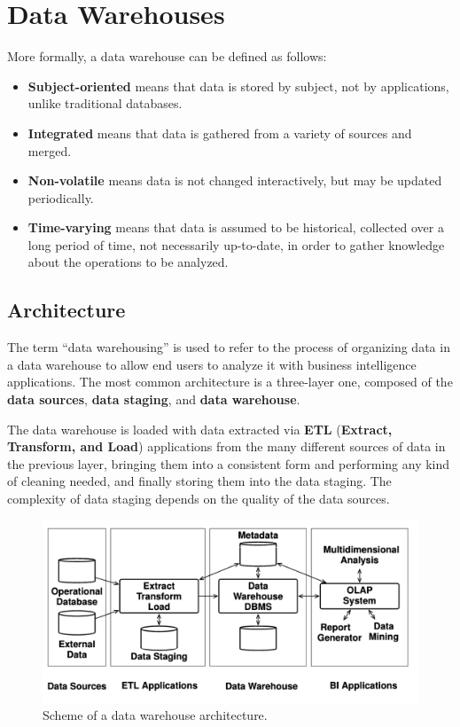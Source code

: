 \section{Data Warehouses}
More formally, a data warehouse can be defined as follows:
\begin{itemize}
    \item \textbf{Subject-oriented} means that data is stored by subject, not by applications, unlike traditional databases.
    
    \item \textbf{Integrated} means that data is gathered from a variety of sources and merged.
    
    \item \textbf{Non-volatile} means data is not changed interactively, but may be updated periodically.

    \item \textbf{Time-varying} means that data is assumed to be historical, collected over a long period of time, not necessarily up-to-date, in order to gather knowledge about the operations to be analyzed.
\end{itemize}

\subsection{Architecture}
The term ``data warehousing'' is used to refer to the process of organizing data in a data warehouse to allow end users to analyze it with business intelligence applications. The most common architecture is a three-layer one, composed of the \textbf{data sources}, \textbf{data staging}, and \textbf{data warehouse}.

The data warehouse is loaded with data extracted via \textbf{ETL} (\textbf{Extract, Transform, and Load}) applications from the many different sources of data in the previous layer, bringing them into a consistent form and performing any kind of cleaning needed, and finally storing them into the data staging. The complexity of data staging depends on the quality of the data sources.
\begin{figure}[h]
    \centering
    \includegraphics[width=0.5\linewidth]{img/three_layer_architecture.png}
    \caption{Scheme of a data warehouse architecture.}
    \label{fig:enter-label}
\end{figure}

